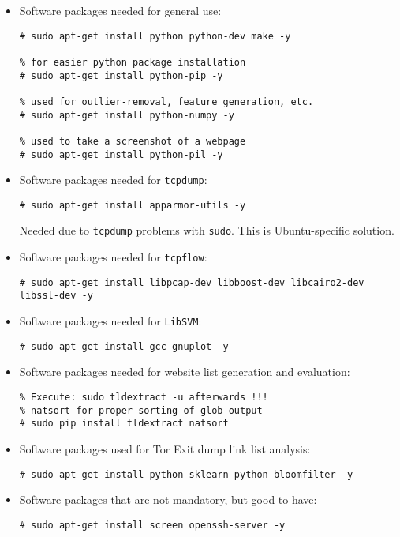 \begin{itemize}
\item Software packages needed for general use:
\vspace{-5mm}
\begin{verbatim}
# sudo apt-get install python python-dev make -y

% for easier python package installation
# sudo apt-get install python-pip -y

% used for outlier-removal, feature generation, etc.
# sudo apt-get install python-numpy -y

% used to take a screenshot of a webpage
# sudo apt-get install python-pil -y
\end{verbatim}
\item Software packages needed for \texttt{tcpdump}:
\vspace{-5mm}
\begin{verbatim}
# sudo apt-get install apparmor-utils -y
\end{verbatim}
\vspace{-5mm}
Needed due to \texttt{tcpdump} problems with \texttt{sudo}. This is Ubuntu-specific solution.
\item Software packages needed for \texttt{tcpflow}:
\vspace{-5mm}
\begin{verbatim}
# sudo apt-get install libpcap-dev libboost-dev libcairo2-dev libssl-dev -y
\end{verbatim}
\item Software packages needed for \texttt{LibSVM}:
\vspace{-5mm}
\begin{verbatim}
# sudo apt-get install gcc gnuplot -y
\end{verbatim}
\item Software packages needed for website list generation and evaluation:
\vspace{-5mm}
\begin{verbatim}
% Execute: sudo tldextract -u afterwards !!!
% natsort for proper sorting of glob output
# sudo pip install tldextract natsort
\end{verbatim}
\item Software packages used for Tor Exit dump link list analysis:
\vspace{-5mm}
\begin{verbatim}
# sudo apt-get install python-sklearn python-bloomfilter -y
\end{verbatim}
\item Software packages that are not mandatory, but good to have:
\vspace{-5mm}
\begin{verbatim}
# sudo apt-get install screen openssh-server -y
\end{verbatim}
\end{itemize}
